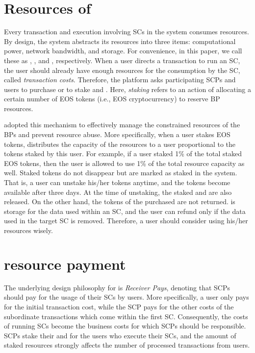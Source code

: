 \section{Resources of \eos}
\label{ss:stake}

Every transaction and execution involving SCs in the \eos system consumes
resources.
%
By design, the system abstracts its resources into three items: computational
power, network bandwidth, and storage. For convenience, in this paper, we call
these as \cpu, \net, and \ram, respectively.
%
When a user directs a transaction to run an SC, the user should already have
enough resources for the consumption by the SC, called \textit{transaction costs}.
%
Therefore, the platform asks participating SCPs and users to purchase \ram or
to stake \cpu and \net.
%
Here, \emph{staking} refers to an action of allocating a certain number of EOS
tokens (i.e., EOS cryptocurrency) to reserve BP resources.

\eos adopted this mechanism to effectively manage the constrained resources of
the BPs and prevent resource abuse.
%
More specifically, when a user stakes EOS tokens, \eos distributes the capacity
of the resources to a user proportional to the tokens staked by this user.
%
For example, if a user staked 1\% of the total staked EOS tokens, then the user
is allowed to use 1\% of the total resource capacity as well.
%
Staked tokens do not disappear but are marked as staked in the system. That is,
a user can unstake his/her tokens anytime, and the tokens become available after
three days. At the time of unstaking, the staked \cpu and \net are also
released.
%
On the other hand, the tokens of the purchased \ram are not returned. \ram is 
storage for the data used within an SC, and the user can refund \ram only if the
data used in the target SC is removed.
%
Therefore, a user should consider using his/her resources wisely.





\section{\EOS resource payment}
\label{ss:receiver}

The underlying design philosophy for \eos is \emph{Receiver Pays}, denoting that
SCPs should pay for the usage of their SCs by users.
%
More specifically, a user only pays for the initial transaction cost, while the
SCP pays for the other costs of the subordinate transactions which come within
the first SC.
%
Consequently, the costs of running SCs become the business costs for which 
SCPs should be responsible. SCPs stake their \cpu and \net for the users who 
execute their SCs, and the amount of staked resources strongly affects the 
number of processed transactions from users.

